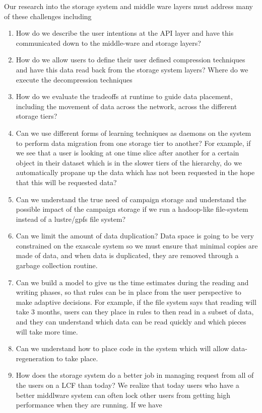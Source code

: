 Our research into the storage system and middle ware layers must address many of these challenges including
\begin{enumerate}
\item  How do we describe the user intentions at the API layer and have this communicated down to the middle-ware and storage layers?
\item How do we allow users to define their user defined compression techniques and have this data read back from the storage system layers? Where do we execute the decompression techniques
\item How do we evaluate the tradeoffs at runtime to guide data placement, including the movement of data across the network, across the
different storage tiers? 
\item Can we use different forms of learning techniques as daemons on the system to perform data migration from one storage tier to another?
For example, if we see that a user is looking at one time slice after another for a certain object in their dataset which is in the slower tiers of 
the hierarchy, do we automatically propane up the data which has not been requested in the hope that this will be requested data?
\item Can we understand the true need of campaign storage and understand the possible impact of the campaign storage if we run a 
hadoop-like file-system instead of a lustre/gpfs file system?
\item Can we limit the amount of data duplication? Data space is going to be very constrained on the exascale system so we must ensure that
minimal copies are made of data, and when data is duplicated, they are removed through a garbage collection routine.
\item Can we build a model to give us the time estimates during the reading and writing phases, so that rules can be in place from the user
perspective to make adaptive decisions. For example, if the file system says that reading will take 3 months, users can they place in rules to
then read in a subset of data, and they can understand which data can be read quickly and which pieces will take more time.
\item Can we understand how to place code in the system which will allow data-regeneration to take place. 
\item How does the storage system do a better job in managing request from all of the users on a LCF than today? We realize that today
users who have a better middlware system can often lock other users from getting high performance when they are running. If we have 

\end{enumerate}
